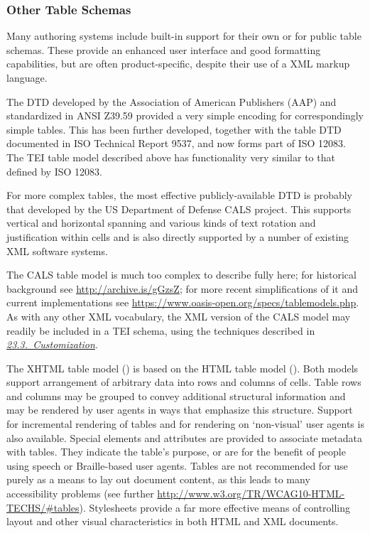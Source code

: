 \subsubsection[{Other Table Schemas}]{Other Table Schemas}\label{FTTAB2}\par
Many authoring systems include built-in support for their own or for public table schemas. These provide an enhanced user interface and good formatting capabilities, but are often product-specific, despite their use of a XML markup language. \par
The DTD developed by the Association of American Publishers (AAP) and standardized in ANSI Z39.59 provided a very simple encoding for correspondingly simple tables. This has been further developed, together with the table DTD documented in ISO Technical Report 9537, and now forms part of ISO 12083. The TEI table model described above has functionality very similar to that defined by ISO 12083. \par
For more complex tables, the most effective publicly-available DTD is probably that developed by the US Department of Defense CALS project. This supports vertical and horizontal spanning and various kinds of text rotation and justification within cells and is also directly supported by a number of existing XML software systems. \par
The CALS table model is much too complex to describe fully here; for historical background see \url{http://archive.is/gGzsZ}; for more recent simplifications of it and current implementations see \url{https://www.oasis-open.org/specs/tablemodels.php}. As with any other XML vocabulary, the XML version of the CALS model may readily be included in a TEI schema, using the techniques described in \textit{\hyperref[MD]{23.3.\ Customization}}.\par
The XHTML table model (\cite{XHTML}) is based on the HTML table model (\cite{HTML4}). Both models support arrangement of arbitrary data into rows and columns of cells. Table rows and columns may be grouped to convey additional structural information and may be rendered by user agents in ways that emphasize this structure. Support for incremental rendering of tables and for rendering on ‘non-visual’ user agents  is also available. Special elements and attributes are provided to associate metadata with tables. They indicate the table's purpose, or are for the benefit of people using speech or Braille-based user agents. Tables are not recommended for use purely as a means to lay out document content, as this leads to many accessibility problems (see further \url{http://www.w3.org/TR/WCAG10-HTML-TECHS/\#tables}). Stylesheets provide a far more effective means of controlling layout and other visual characteristics in both HTML and XML documents.
